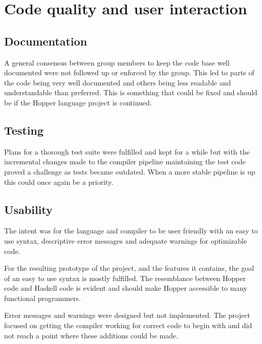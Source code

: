 \section{Code quality and user interaction}

\subsection{Documentation}

A general consensus between group members to keep the code base well documented were not followed up or enforced by the group. This led to parts of the code being very well documented and others being less readable and understandable than preferred. This is something that could be fixed and should be if the Hopper language project is continued.

\subsection{Testing}

Plans for a thorough test suite were fulfilled and kept for a while but with the incremental changes made to the compiler pipeline maintaining the test code proved a challenge as tests became outdated. When a more stable pipeline is up this could once again be a priority.

\subsection{Usability}

The intent was for the language and compiler to be user friendly with an easy to use syntax, descriptive error messages and adequate warnings for optimizable code.

For the resulting prototype of the project, and the features it contains, the goal of an easy to use syntax is mostly fulfilled. The resemblance between Hopper code and Haskell code is evident and should make Hopper accessible to many functional programmers. %

Error messages and warnings were designed but not implemented. The project focused on getting the compiler working for correct code to begin with and did not reach a point where these additions could be made.




